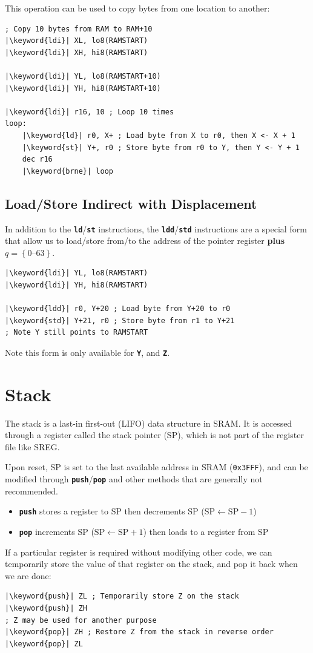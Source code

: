 \documentclass[a4paper]{report}
\newcommand{\keyword}[1]{\textcolor[rgb]{0.00,0.50,0.00}{\textbf{#1}}}
\newcommand{\keywordinline}[1]{\textcolor[rgb]{0.00,0.50,0.00}{\textbf{\texttt{#1}}}}
\begin{document}
This operation can be used to copy bytes from one location to another:
\begin{verbatim}
; Copy 10 bytes from RAM to RAM+10
|\keyword{ldi}| XL, lo8(RAMSTART)
|\keyword{ldi}| XH, hi8(RAMSTART)

|\keyword{ldi}| YL, lo8(RAMSTART+10)
|\keyword{ldi}| YH, hi8(RAMSTART+10)

|\keyword{ldi}| r16, 10 ; Loop 10 times
loop:
    |\keyword{ld}| r0, X+ ; Load byte from X to r0, then X <- X + 1
    |\keyword{st}| Y+, r0 ; Store byte from r0 to Y, then Y <- Y + 1
    dec r16
    |\keyword{brne}| loop
\end{verbatim}
\subsection{Load/Store Indirect with Displacement}
In addition to the \keywordinline{ld}/\keywordinline{st} instructions, the \keywordinline{ldd}/\keywordinline{std}
instructions are a special form that allow us to load/store from/to the address of the pointer register
\textbf{plus} \(q = \left\{ \numrange{0}{63} \right\}\).
\begin{verbatim}
|\keyword{ldi}| YL, lo8(RAMSTART)
|\keyword{ldi}| YH, hi8(RAMSTART)

|\keyword{ldd}| r0, Y+20 ; Load byte from Y+20 to r0
|\keyword{std}| Y+21, r0 ; Store byte from r1 to Y+21
; Note Y still points to RAMSTART
\end{verbatim}
Note this form is only available for \keywordinline{Y}, and \keywordinline{Z}.
\section{Stack}
The stack is a last-in first-out (LIFO) data structure in SRAM\@.
It is accessed through a register called the stack pointer (SP),
which is not part of the register file like SREG\@.

Upon reset, SP is set to the last available address in SRAM (\texttt{0x3FFF}), %
and can be modified through \keywordinline{push}/\keywordinline{pop} and other methods that are generally not recommended.
\begin{itemize}
    \item \keywordinline{push} stores a register to SP then decrements SP (\(\mathrm{SP} \leftarrow \mathrm{SP} - 1\))
    \item \keywordinline{pop} increments SP (\(\mathrm{SP} \leftarrow \mathrm{SP} + 1\)) then loads to a register from SP
\end{itemize}
If a particular register is required without modifying other code, we can temporarily
store the value of that register on the stack, and pop it back when we are done:
\begin{verbatim}
|\keyword{push}| ZL ; Temporarily store Z on the stack
|\keyword{push}| ZH
; Z may be used for another purpose
|\keyword{pop}| ZH ; Restore Z from the stack in reverse order
|\keyword{pop}| ZL
\end{verbatim}
\end{document}

